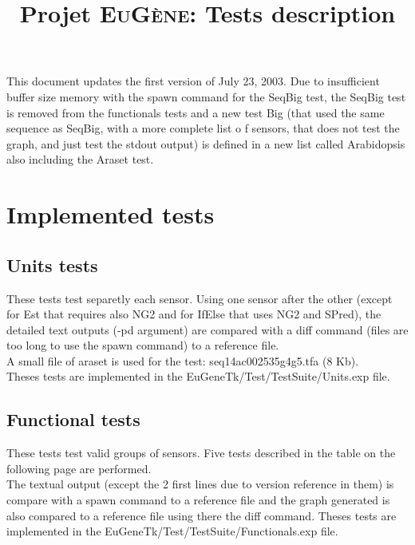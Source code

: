 \documentclass[a4paper,11pt]{article}
\newcommand{\EuGenie}{\textsc{EuG{\`e}ne}}
\begin{document}
\setlength{\parindent}{0pt}

\title{Projet \EuGenie: Tests description}
\maketitle

This document updates the first version of July 23, 2003.
Due to insufficient buffer size memory with the spawn command for the SeqBig test, the SeqBig test is removed from the functionals tests and a new test Big (that used the same sequence as SeqBig, with a more complete list o
f sensors, that does not test the graph, and just test the stdout output) is defined in a new list called Arabidopsis also including the Araset test.

\section{Implemented tests}

\subsection{Units tests}
These tests test separetly each sensor. Using one sensor after the other (except for Est that requires also NG2 and for IfElse that uses NG2 and SPred), the detailed text outputs (-pd argument) are compared with a diff command (files are too long to use the spawn command) to a reference file.\\
A small file of araset is used for the test: seq14ac002535g4g5.tfa (8 Kb).\\
Theses tests are implemented in the EuGeneTk/Test/TestSuite/Units.exp file.\\

\subsection{Functional tests}
These tests test valid groups of sensors. Five tests described in the table on the following page are performed. \\
The textual output (except the 2 first lines due to version reference in them) is compare with a spawn command to a reference file and the graph generated is also compared to a reference file using there the diff command.  
Theses tests are implemented in the EuGeneTk/Test/TestSuite/Functionals.exp file.
\end{document}

